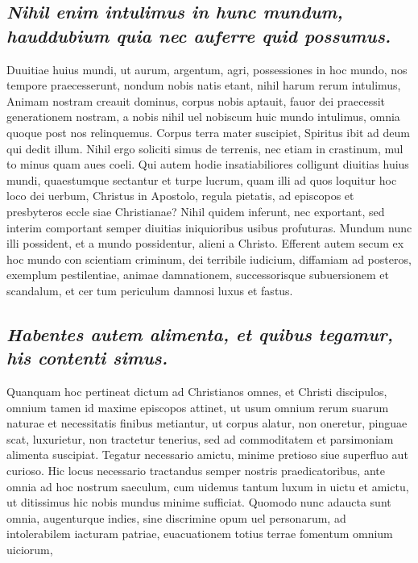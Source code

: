 \documentclass{article}
\begin{document}
\begin{pages}
\subsection*{\textit{Nihil enim intulimus in hunc mundum, hauddubium quia nec auferre quid possumus. }}\pstart Duuitiae huius mundi, ut aurum, argentum, agri, possessiones in hoc mundo, nos tempore praecesserunt, nondum nobis natis etant, nihil harum rerum intulimus, Animam nostram creauit dominus, corpus nobis aptauit, fauor dei praecessit generationem nostram, a nobis nihil uel nobiscum huic mundo intulimus, omnia quoque post nos relinquemus. Corpus terra mater suscipiet, Spiritus ibit ad deum qui dedit illum. Nihil ergo soliciti simus de terrenis, nec etiam in crastinum, mul to minus quam aues coeli. Qui autem hodie insatiabiliores colligunt diuitias huius mundi, quaestumque sectantur et turpe lucrum, quam illi ad quos loquitur hoc loco dei uerbum, Christus in Apostolo, regula pietatis, ad episcopos et presbyteros eccle siae Christianae? Nihil quidem inferunt, nec exportant, sed interim comportant semper diuitias iniquioribus usibus profuturas. Mundum nunc illi possident, et a mundo possidentur, alieni a Christo. Efferent autem secum ex hoc mundo con scientiam criminum, dei terribile iudicium, diffamiam ad posteros, exemplum pestilentiae, animae damnationem, successorisque subuersionem et scandalum, et cer tum periculum damnosi luxus et fastus.  \pend
{}
{}
\subsection*{\textit{Habentes autem alimenta, et quibus tegamur, his contenti simus. }}\pstart Quanquam hoc pertineat dictum ad Christianos omnes, et Christi discipulos, omnium tamen id maxime episcopos attinet, ut usum omnium rerum suarum naturae et necessitatis finibus metiantur, ut corpus alatur, non oneretur, pinguae scat, luxurietur, non tractetur tenerius, sed ad commoditatem et parsimoniam alimenta suscipiat. Tegatur necessario amictu, minime pretioso siue superfluo aut curioso. Hic locus necessario tractandus semper nostris praedicatoribus, ante omnia ad hoc nostrum saeculum, cum uidemus tantum luxum in uictu et amictu, ut ditissimus hic nobis mundus minime sufficiat. Quomodo nunc adaucta sunt omnia, augenturque indies, sine discrimine opum uel personarum, ad intolerabilem iacturam patriae, euacuationem totius terrae fomentum omnium uiciorum,  \pend

\end{pages}
\end{document}
